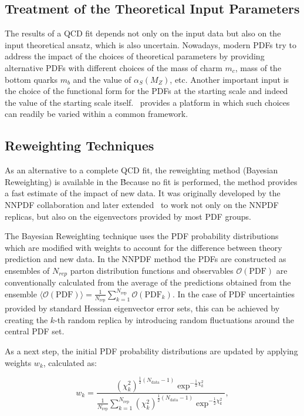 \subsection{Treatment of the Theoretical Input Parameters}

The results of a QCD fit depends not only on the input data but also on the 
input theoretical ansatz, which is also uncertain. Nowadays, modern PDFs 
try to address the impact of the choices of theoretical parameters by providing
alternative PDFs with different choices of the mass of charm $m_c$, mass of the bottom quarks $m_b$ and the value of $\alpha_S(M_Z)$, etc. 
Another important input is the choice of the functional form for the PDFs at the starting scale and indeed the value of the starting scale itself. \fitter\ provides a platform in which such choices can readily be varied within a common framework.

\subsection{Reweighting Techniques}

As an alternative to a complete QCD fit, the reweighting method (Bayesian Reweighting) is available in the \fitter\.
Because no fit is performed, the method provides a fast estimate of the impact of new data. 
It was originally developed by the NNPDF collaboration \cite{Ball:2011gg,Ball:2010gb} and later extended~\cite{Watt:2012tq} 
to work not only on the NNPDF replicas, but also on the eigenvectors provided by most PDF groups. 

The Bayesian Reweighting technique uses the PDF probability distributions which are modified with weights 
to account for the difference between theory prediction and new data.
In the NNPDF method the PDFs are constructed as ensembles of $N_{rep}$ parton 
distribution functions and observables $\mathcal{O}(\mathrm{PDF})$ are conventionally calculated from the average
of the predictions obtained from the ensemble 
$\langle\mathcal{O}(\mathrm{PDF})\rangle =  \frac{1}{N_{\mathrm{rep}}} \sum_{k=1}^{N_{\mathrm{rep}}} \mathcal{O}(\mathrm{PDF}_k)$.
In the case of PDF uncertainties provided by standard Hessian eigenvector error sets, this can be achieved 
by creating the $k$-th random replica by introducing random fluctuations around the central PDF set.

As a next step, the initial PDF probability distributions are updated by applying weights 
$w_k$, calculated as:

\begin{equation}
 w_k = \frac{(\chi^2_k)^{\frac{1}{2} (N_{\mathrm{data}}-1) } \exp^{-\frac{1}{2}\chi^2_k}}{ \frac{1}{N_{\mathrm{rep}}} \sum^{N_{\mathrm{rep}}}_{k=1}(\chi^2_k)^{\frac{1}{2}(N_{\mathrm{data}}-1)} \exp^{-\frac{1}{2}\chi^2_k}  },
\end{equation}

